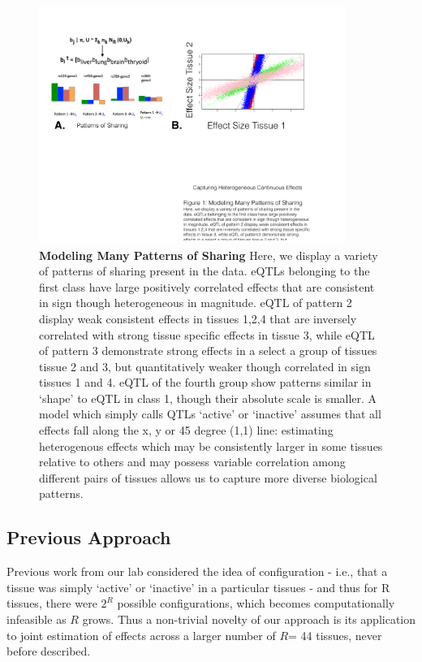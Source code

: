 
\newline
\begin{figure}[htbp]
\includegraphics[width=10cm]{Figures/Patterns.pdf}
\caption{\textbf{Modeling Many Patterns of Sharing} Here, we display a variety of patterns of sharing present in the data. eQTLs belonging to the first class have large positively correlated effects that are consistent in sign though heterogeneous in magnitude. eQTL of pattern 2 display weak consistent effects in tissues 1,2,4 that are inversely correlated with strong tissue specific effects in tissue 3, while eQTL of pattern 3 demonstrate strong effects in a select a group of tissues tissue 2 and 3, but quantitatively weaker though correlated in sign tissues 1 and 4. eQTL of the fourth group show patterns similar in `shape' to eQTL in class 1, though their absolute scale is smaller. A model which simply calls QTLs `active' or `inactive' assumes that all effects fall along the x, y or 45 degree (1,1) line: estimating heterogenous effects which may be consistently larger in some tissues relative to others and may possess variable correlation among different pairs of tissues allows us to capture more diverse biological patterns.}
\label{fig:Patterns}
\end{figure}
\newline


\subsection{Previous Approach}
 
Previous work from our lab considered the idea of configuration - i.e., that a tissue was simply `active' or `inactive' in a particular tissues - and thus for R tissues, there were $2^{R}$ possible configurations, which becomes computationally infeasible as $R$ grows. Thus a non-trivial novelty of our approach is its application to joint estimation of effects across a larger number of $R$= 44 tissues, never before described.

